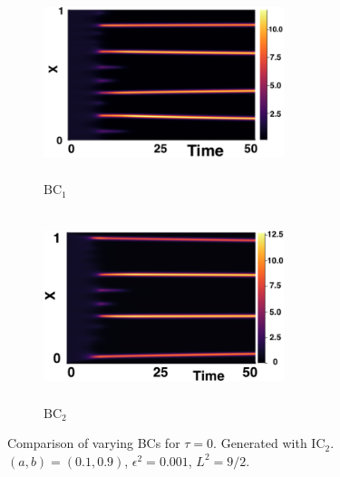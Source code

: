 \begin{figure}[H]
    \centering
    \begin{subfigure}[b]{0.45\textwidth}
        \centering
        \includegraphics[width=7cm,height=5.5cm]{ic20.png}
        \caption{$\text{BC}_1$}
        \label{}
    \end{subfigure}
    \hfill
    \begin{subfigure}[b]{0.45\textwidth}
        \centering
        \includegraphics[width=7cm,height=5.5cm]{bc0.png}
        \caption{$\text{BC}_2$}
        \label{}
    \end{subfigure}
    \caption{Comparison of varying BCs for $\tau=0$. Generated with $\text{IC}_2$. $(a,b)=(0.1,0.9)$, $\epsilon^2=0.001$, $L^2=9/2$.}
    \label{fig:bctau1}
\end{figure}

